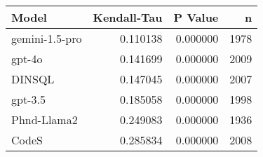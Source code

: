 \begin{tabular}{lrrr}
\toprule
Model & Kendall-Tau & P Value & n \\
\midrule
gemini-1.5-pro & 0.110138 & 0.000000 & 1978 \\
gpt-4o & 0.141699 & 0.000000 & 2009 \\
DINSQL & 0.147045 & 0.000000 & 2007 \\
gpt-3.5 & 0.185058 & 0.000000 & 1998 \\
Phnd-Llama2 & 0.249083 & 0.000000 & 1936 \\
CodeS & 0.285834 & 0.000000 & 2008 \\
\bottomrule
\end{tabular}
